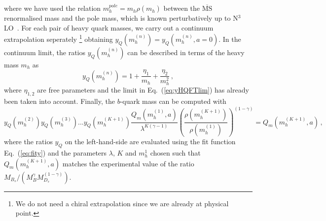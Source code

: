 where we have used the relation  $ m^{pole}_h= m_{h}^{} \rho( m_{h}^{})$
between the $\overline{\mbox{MS}}$ renormalised mass and the pole
mass, which is known perturbatively up to N$^3$LO~\cite{Chetyrkin:1999pq}.
For each pair of heavy quark masses, we carry out a continuum
extrapolation seperately
\footnote{We do not need a chiral extrapolation since we are already at physical point.}
obtaining $y_Q( m^{(n)}_h)=y_Q( m^{(n)}_h,a=0)$.
In the continuum limit, the ratios $y_Q( m^{(n)}_h)$ can be described
in terms of the heavy mass $m_h$ as~\cite{ETM:2011zey}
\begin{equation}
  y_Q( m^{(n)}_h) = 1 + \frac{\eta_1}{ m_h}+ \frac{\eta_2}{ m_h^2}\,,
  \label{eq:fity}
\end{equation}
where $\eta_{1,2}$ are free parameters and the limit in
Eq.~(\ref{eq:yHQFTlim}) has already been taken into account.
Finally, the $b$-quark mass can be computed with
\begin{equation}
  y_Q( m^{(2)}_h)y_Q( m^{(3)}_h)...y_Q( m^{(K+1)}_h)\frac{Q_m( m_h^{(1)},a)}{\lambda^{K(\gamma-1)}}
  \left(\frac{ \rho( m_{h}^{(K+1)})}{\rho( m_{h}^{(1)})}\right)^{(1-\gamma)}=Q_m( m_h^{(K+1)},a)
  \,,
\end{equation}
where the ratios $y_Q$ on the left-hand-side are evaluated using the
fit function Eq.~(\ref{eq:fity}) and the parameters $\lambda$, $K$ and
$ m_h^1$ chosen such that $Q_m( m_h^{(K+1)},a)$ matches 
the experimental value of the ratio $M_{B_s}/(M_{B}^\gamma M_{D_s}^{(1-\gamma)})$.


\endinput

